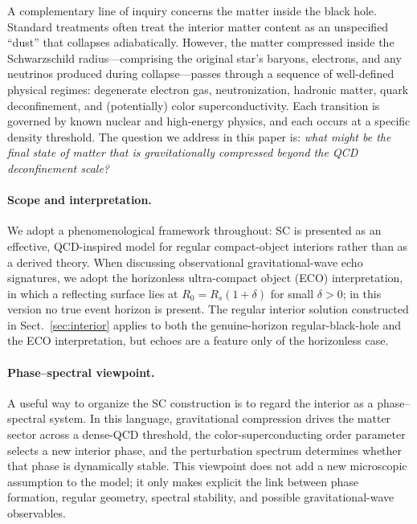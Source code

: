 \documentclass[epj]{svjour}
\begin{document}
A complementary line of inquiry concerns the matter inside the black hole. Standard treatments often treat the interior matter content as an unspecified ``dust'' that collapses adiabatically. However, the matter compressed inside the Schwarzschild radius---comprising the original star's baryons, electrons, and any neutrinos produced during collapse---passes through a sequence of well-defined physical regimes: degenerate electron gas, neutronization, hadronic matter, quark deconfinement, and (potentially) color superconductivity. Each transition is governed by known nuclear and high-energy physics, and each occurs at a specific density threshold. The question we address in this paper is: \emph{what might be the final state of matter that is gravitationally compressed beyond the QCD deconfinement scale?}

\paragraph{Scope and interpretation.}
We adopt a phenomenological framework throughout: SC is presented as an effective, QCD-inspired model for regular compact-object interiors rather than as a derived theory. When discussing observational gravitational-wave echo signatures, we adopt the horizonless ultra-compact object (ECO) interpretation, in which a reflecting surface lies at $R_0 = R_s(1+\delta)$ for small $\delta > 0$; in this version no true event horizon is present. The regular interior solution constructed in Sect.~\ref{sec:interior} applies to both the genuine-horizon regular-black-hole and the ECO interpretation, but echoes are a feature only of the horizonless case.

\paragraph{Phase--spectral viewpoint.}
A useful way to organize the SC construction is to regard the interior as a
phase--spectral system. In this language, gravitational compression drives the matter sector across a dense-QCD threshold, the color-superconducting order parameter selects a new interior phase, and the perturbation spectrum determines whether that phase is dynamically stable. This viewpoint does not add a new microscopic assumption to the model; it only makes explicit the link between phase formation, regular geometry, spectral stability, and possible gravitational-wave observables.
\end{document}
